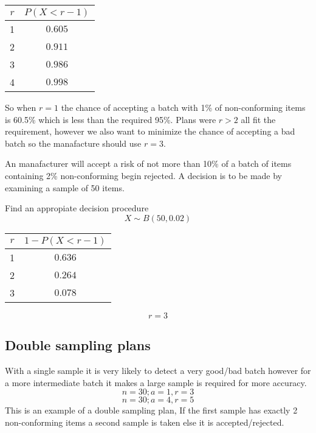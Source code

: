     \begin{center}
    \begin{tabular}{c|c}
    $r$ & $P(X < r-1)$ \\
    \hline
    1 & $0.605$ \\
    2 & $0.911$ \\
    3 & $0.986$ \\
    4 & $0.998$ \\
    \end{tabular}
    \end{center}

    \noindent
    So when $r = 1$ the chance of accepting a batch with 1\% of non-conforming items is 60.5\% which is less than the required 95\%. Plans were $r > 2$ all fit the requirement, however we also want to minimize the chance of accepting a bad batch so the manafacture should use $r = 3$.

    \begin{example}
    {
        An manafacturer will accept a risk of not more than 10\% of a batch of items containing 2\% non-conforming begin rejected. A decision is to be made by examining a sample of 50 items.
    }

    \begin{step}{Find an appropiate decision procedure}
    $$X \sim B(50, 0.02)$$

    \begin{center}
    \begin{tabular}{c|c}
    $r$ & $1 - P(X < r-1)$ \\
    \hline
    1 & $0.636$ \\
    2 & $0.264$ \\
    3 & $0.078$ \\
    \end{tabular}
    \end{center}

    $$r = 3$$
    \end{step}

    \end{example}

    \subsection{Double sampling plans}
    With a single sample it is very likely to detect a very good/bad batch however for a more intermediate batch it makes a large sample is required for more accuracy.
    $$n = 30; a = 1, r = 3$$
    $$n = 30; a = 4, r = 5$$
    This is an example of a double sampling plan, If the first sample has exactly 2 non-conforming items a second sample is taken else it is accepted/rejected.

